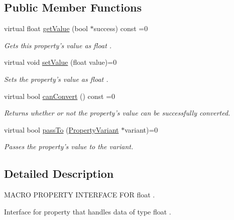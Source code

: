 \subsection*{Public Member Functions}
\begin{DoxyCompactItemize}
\item 
virtual float \hyperlink{class_i_float_property_a5f3b98066c898de66db9141b01253d60}{get\-Value} (bool $\ast$success) const =0
\begin{DoxyCompactList}\small\item\em Gets this property's value as float . \end{DoxyCompactList}\item 
virtual void \hyperlink{class_i_float_property_a358077ee2ced41069d9990d93ce5ddfa}{set\-Value} (float value)=0
\begin{DoxyCompactList}\small\item\em Sets the property's value as float . \end{DoxyCompactList}\item 
virtual bool \hyperlink{class_i_float_property_a1e460fc2f90845794910bc74aabe5236}{can\-Convert} () const =0
\begin{DoxyCompactList}\small\item\em Returns whether or not the property's value can be successfully converted. \end{DoxyCompactList}\item 
virtual bool \hyperlink{class_i_float_property_ab2c6d31035b4a5385545740a337be706}{pass\-To} (\hyperlink{class_property_variant}{Property\-Variant} $\ast$variant)=0
\begin{DoxyCompactList}\small\item\em Passes the property's value to the variant. \end{DoxyCompactList}\end{DoxyCompactItemize}


\subsection{Detailed Description}
M\-A\-C\-R\-O P\-R\-O\-P\-E\-R\-T\-Y I\-N\-T\-E\-R\-F\-A\-C\-E F\-O\-R float . 

Interface for property that handles data of type float . 

